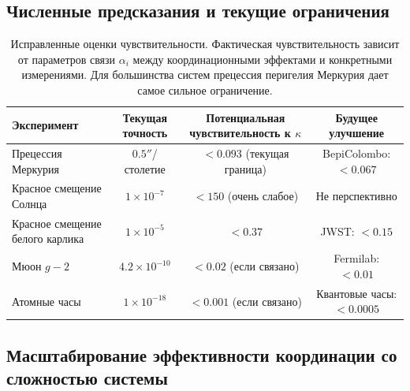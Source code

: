 \documentclass[11pt,a4paper]{article}
\begin{document}
	\subsection{Численные предсказания и текущие ограничения}
	
	\begin{table}[htbp]
		\centering
		\small
		\begin{tabular}{lccc}
			\toprule
			\textbf{Эксперимент} & \textbf{Текущая точность} & \textbf{Потенциальная чувствительность к $\kappa$} & \textbf{Будущее улучшение} \\
			\midrule
			Прецессия Меркурия & $0.5''$/столетие & $<0.093$ (текущая граница) & BepiColombo: $<0.067$ \\
			Красное смещение Солнца & $1\times10^{-7}$ & $<150$ (очень слабое) & Не перспективно \\
			Красное смещение белого карлика & $1\times10^{-5}$ & $<0.37$ & JWST: $<0.15$ \\
			Мюон $g-2$ & $4.2\times10^{-10}$ & $<0.02$ (если связано) & Fermilab: $<0.01$ \\
			Атомные часы & $1\times10^{-18}$ & $<0.001$ (если связано) & Квантовые часы: $<0.0005$ \\
			\bottomrule
		\end{tabular}
		\caption{Исправленные оценки чувствительности. Фактическая чувствительность зависит от параметров связи $\alpha_i$ между координационными эффектами и конкретными измерениями. Для большинства систем прецессия перигелия Меркурия дает самое сильное ограничение.}
	\end{table}
	
	\subsection{Масштабирование эффективности координации со сложностью системы}
	
\end{document}
